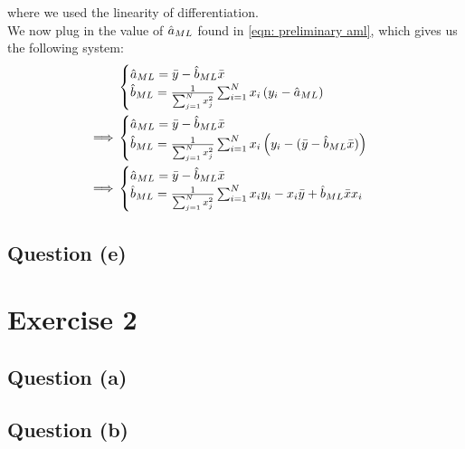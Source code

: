 \documentclass[12pt]{article}
\begin{document}
where we used the linearity of differentiation. \\
We now plug in the value of \(\hat a_{ML}\) found in \eqref{eqn: preliminary aml}, which gives us the following system:
\begin{align*}
             &
    \begin{cases}
        \hat a_{ML} = \bar{y} - \hat b_{ML} \bar{x} \\
        \hat b_{ML} = \frac{1}{\sum_{j=1}^N x_j^2} \sum_{i=1}^N x_i \left(y_i - \hat a_{ML} \right)
    \end{cases} \\
    \implies &
    \begin{cases}
        \hat a_{ML} = \bar{y} - \hat b_{ML} \bar{x} \\
        \hat b_{ML} = \frac{1}{\sum_{j=1}^N x_j^2} \sum_{i=1}^N x_i \left(y_i - (\bar{y} - \hat b_{ML} \bar{x}) \right)
    \end{cases} \\
    \implies &
    \begin{cases}
        \hat a_{ML} = \bar{y} - \hat b_{ML} \bar{x} \\
        \hat b_{ML} = \frac{1}{\sum_{j=1}^N x_j^2} \sum_{i=1}^N x_i y_i - x_i\bar{y} + \hat b_{ML} \bar{x}x_i
    \end{cases} \\
\end{align*}

\subsection{Question (e)}
\section{Exercise 2} %
\subsection{Question (a)}
\subsection{Question (b)}

\clearpage

\end{document}
